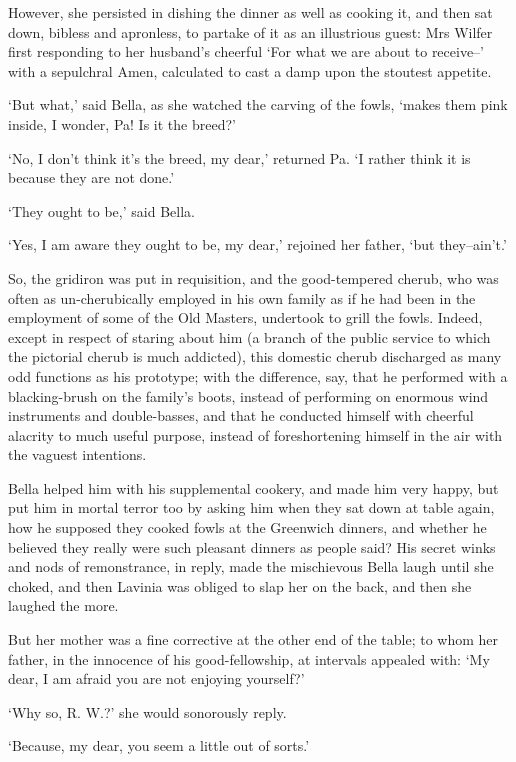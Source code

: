 However, she persisted in dishing the dinner as well as cooking it, and
then sat down, bibless and apronless, to partake of it as an illustrious
guest: Mrs Wilfer first responding to her husband’s cheerful ‘For what
we are about to receive--’ with a sepulchral Amen, calculated to cast a
damp upon the stoutest appetite.

‘But what,’ said Bella, as she watched the carving of the fowls, ‘makes
them pink inside, I wonder, Pa! Is it the breed?’

‘No, I don’t think it’s the breed, my dear,’ returned Pa. ‘I rather
think it is because they are not done.’

‘They ought to be,’ said Bella.

‘Yes, I am aware they ought to be, my dear,’ rejoined her father, ‘but
they--ain’t.’

So, the gridiron was put in requisition, and the good-tempered cherub,
who was often as un-cherubically employed in his own family as if he had
been in the employment of some of the Old Masters, undertook to grill
the fowls. Indeed, except in respect of staring about him (a branch of
the public service to which the pictorial cherub is much addicted), this
domestic cherub discharged as many odd functions as his prototype; with
the difference, say, that he performed with a blacking-brush on the
family’s boots, instead of performing on enormous wind instruments and
double-basses, and that he conducted himself with cheerful alacrity to
much useful purpose, instead of foreshortening himself in the air with
the vaguest intentions.

Bella helped him with his supplemental cookery, and made him very happy,
but put him in mortal terror too by asking him when they sat down at
table again, how he supposed they cooked fowls at the Greenwich dinners,
and whether he believed they really were such pleasant dinners as people
said? His secret winks and nods of remonstrance, in reply, made the
mischievous Bella laugh until she choked, and then Lavinia was obliged
to slap her on the back, and then she laughed the more.

But her mother was a fine corrective at the other end of the table; to
whom her father, in the innocence of his good-fellowship, at intervals
appealed with: ‘My dear, I am afraid you are not enjoying yourself?’

‘Why so, R. W.?’ she would sonorously reply.

‘Because, my dear, you seem a little out of sorts.’

